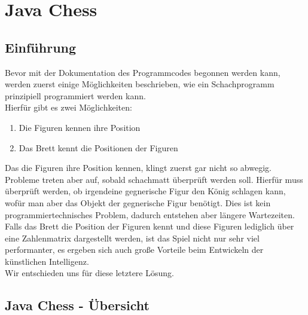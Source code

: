\documentclass[12pt,a4paper]{article}
\begin{document}
{%
\clearpage\vfill\newpage{}

\section{Java Chess}
\label{SEC:JAVACHESS}

\subsection{Einführung}
\label{SUBSEC:JAVACHESS-INTRO}

Bevor mit der Dokumentation des Programmcodes begonnen werden kann, werden zuerst einige Möglichkeiten beschrieben, wie ein Schachprogramm prinzipiell programmiert werden kann.\\
Hierfür gibt es zwei Möglichkeiten:

\begin{enumerate}
	\item{Die Figuren kennen ihre Position}
	\item{Das Brett kennt die Positionen der Figuren}
\end{enumerate}
Das die Figuren ihre Position kennen, klingt zuerst gar nicht so abwegig. Probleme treten aber auf, sobald schachmatt überprüft werden soll. Hierfür muss überprüft werden, ob irgendeine gegnerische Figur den König schlagen kann, wofür man aber das Objekt der gegnerische Figur benötigt. Dies ist kein programmiertechnisches Problem, dadurch entstehen aber längere Wartezeiten. \\
Falls das Brett die Position der Figuren kennt und diese Figuren lediglich über eine Zahlenmatrix dargestellt werden, ist das Spiel nicht nur sehr viel performanter, es ergeben sich auch große Vorteile beim Entwickeln der künstlichen Intelligenz. \\ 
Wir entschieden uns für diese letztere Lösung.

\subsection{Java Chess - Übersicht}
\label{SUBSEC:JAVACHESS-OVERVIEW}

}
\end{document}
